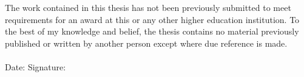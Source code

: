 \label{declaration}
The work contained in this thesis has not been previously submitted to meet requirements for an award at this or any other higher education institution. To the best of my knowledge and belief, the thesis contains no material previously published or written by another person except where due reference is made. \\
\\[1.5cm]
Date:	\dotfill\enspace Signature: \dotfill
\\[3.5cm]
\cleardoublepage


